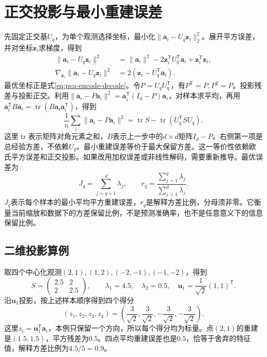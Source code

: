\section{正交投影与最小重建误差}
先固定正交基$U_q$，为单个观测选择坐标，最小化$\|\bm a_i-U_q\bm z_i\|_2^2$。展开平方误差，并对坐标$\bm z_i$求梯度，得到
\begin{align}
 \|\bm a_i-U_q\bm z_i\|^2
 &=\|\bm a_i\|^2-2\bm z_i^{\mathsf T}U_q^{\mathsf T}\bm a_i+\bm z_i^{\mathsf T}\bm z_i,\\
 \nabla_{\bm z_i}\|\bm a_i-U_q\bm z_i\|^2&=2(\bm z_i-U_q^{\mathsf T}\bm a_i).
\end{align}
最优坐标正是式\eqref{eq:pca-encode-decode}。令$P=U_qU_q^{\mathsf T}$，有$P^{\mathsf T}=P,P^2=P$。投影残差与投影正交。利用$\|\bm a_i-P\bm a_i\|^2=\bm a_i^{\mathsf T}(I_d-P)\bm a_i$，对样本求平均，再用$\bm a_i^{\mathsf T}B\bm a_i=\operatorname{tr}(B\bm a_i\bm a_i^{\mathsf T})$，得到
\begin{equation}
 \frac1n\sum_i\|\bm a_i-P\bm a_i\|^2
 =\operatorname{tr}S-\operatorname{tr}(U_q^{\mathsf T}SU_q).
 \label{eq:pca-reconstruction-objective}
\end{equation}
这里$\operatorname{tr}$表示矩阵对角元素之和，$B$表示上一步中的$d\times d$矩阵$I_d-P$。右侧第一项是总经验方差，不依赖$U_q$。最小重建误差等价于最大保留方差。这一等价性依赖欧氏平方误差和正交投影。如果改用加权误差或非线性解码，需要重新推导。最优误差为
\begin{equation}
 J_q=\sum_{j=q+1}^d\lambda_j,
 \qquad r_q=\frac{\sum_{j=1}^q\lambda_j}{\sum_{j=1}^d\lambda_j}.
 \label{eq:pca-explained-variance}
\end{equation}
$J_q$表示每个样本的最小平均平方重建误差，$r_q$是解释方差比例，分母须非零。它衡量当前缩放和数据下的方差保留比例，不是预测准确率，也不是任意意义下的信息保留比例。

\subsection{二维投影算例}
取四个中心化观测$(2,1),(1,2),(-2,-1),(-1,-2)$，得到
\begin{equation}
 S=\begin{pmatrix}2.5&2\\2&2.5\end{pmatrix},\qquad
 \lambda_1=4.5,\quad\lambda_2=0.5,\quad
 \bm u_1=\frac1{\sqrt2}(1,1)^{\mathsf T}.
\end{equation}
沿$\bm u_1$投影，按上述样本顺序得到四个得分
\begin{equation}
 (z_1,z_2,z_3,z_4)=\left(\frac3{\sqrt2},\frac3{\sqrt2},-\frac3{\sqrt2},-\frac3{\sqrt2}\right).
\end{equation}
这里$z_i=\bm u_1^{\mathsf T}\bm a_i$，本例只保留一个方向，所以每个得分均为标量。点$(2,1)$的重建是$(1.5,1.5)$，平方残差为$0.5$。四点平均重建误差也是$0.5$，恰等于舍弃的特征值，解释方差比例为$4.5/5=0.9$。

